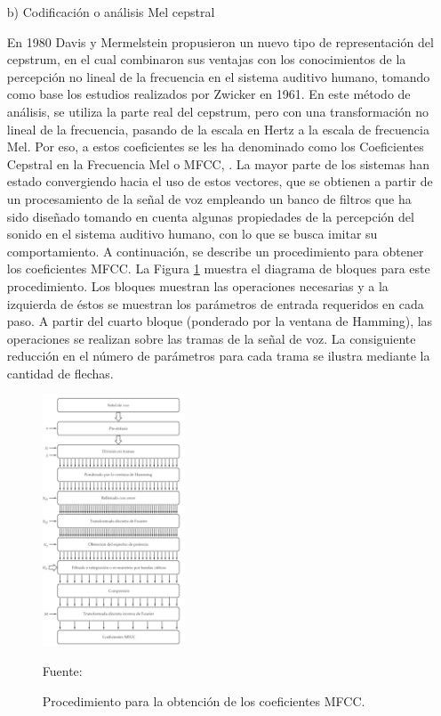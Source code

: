 \begin{enumerate}
\newpage
\item[b)]Codificación o análisis Mel cepstral
\par
En 1980 Davis y Mermelstein propusieron un nuevo tipo de representación del cepstrum, en el cual combinaron sus ventajas con los conocimientos de la percepción no lineal de la frecuencia en el sistema auditivo humano, tomando como base los estudios realizados por Zwicker en 1961. En este método de análisis, se utiliza la parte real del cepstrum, pero con una transformación no lineal de la frecuencia, pasando de la escala en Hertz a la escala de frecuencia Mel. Por eso, a estos coeficientes se les ha denominado como los Coeficientes Cepstral en la Frecuencia Mel o MFCC, \cite{eyra}.
\vskip 0.5cm
La mayor parte de los sistemas han estado convergiendo hacia el uso de estos vectores, que se obtienen a partir de un procesamiento de la señal de voz empleando un banco de filtros que ha sido diseñado tomando en cuenta algunas propiedades de la percepción del sonido en el sistema auditivo humano, con lo que se busca imitar su comportamiento.
\vskip 0.5cm
A continuación, se describe un procedimiento para obtener los coeficientes MFCC. La Figura \ref{fig:figura2.38} muestra el diagrama de bloques para este procedimiento. Los bloques muestran las operaciones necesarias y a la izquierda de éstos se muestran los parámetros de entrada requeridos en cada paso. A partir del cuarto bloque (ponderado por la ventana de Hamming), las operaciones se realizan sobre las tramas de la señal de voz. La consiguiente reducción en el número de parámetros para cada trama se ilustra mediante la cantidad de flechas.

\newpage
\begin{figure}[ht]
\begin{center}
\includegraphics[width=0.4\textwidth]{Imagenes/Cap2/image039}
\end{center}
\begin{center}
\vskip -0.5cm
\caption{\small{Procedimiento para la obtención de los coeficientes MFCC.}}
\label{fig:figura2.38}
{\small{Fuente: \cite{eyra}}}
\end{center}
\end{figure}


\end{enumerate}
